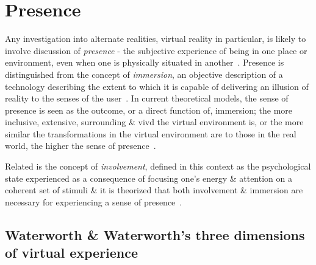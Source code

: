 

\section{Presence}

Any investigation into alternate realities, virtual reality in particular, is likely to involve discussion of \textit{presence} - the subjective experience of being in one place or environment, even when one is physically situated in another~\cite{Witmer1998}. Presence is distinguished from the concept of \textit{immersion}, an objective description of a technology describing the extent to which it is capable of delivering an illusion of reality to the senses of the user~\cite{Slater1997}. In current theoretical models, the sense of presence is seen as the outcome, or a direct function of, immersion; the more inclusive, extensive, surrounding \& vivd the virtual environment is, or the more similar the transformations in the virtual environment are to those in the real world, the higher the sense of presence~\cite{Constantin2003}.

Related is the concept of \textit{involvement}, defined in this context as the psychological state experienced as a consequence of focusing one's energy \& attention on a coherent set of stimuli \& it is theorized that both involvement \& immersion are necessary for experiencing a sense of presence~\cite{Witmer1998}.

\subsection{Waterworth \& Waterworth's three dimensions of virtual experience}

\newcommand{\presencefootnote}{\footnote{\textbf{Presence} in the context of this model is defined as a state of heightened perceptual processing of environmental stimuli (\textit{``a psychological focus on direct perceptual processing''}~\cite{Waterworth2001}) accompanied by lessened conceptual reasoning, whether these environmental stimuli originate from a real environment, a virtual environment, a mixed reality environment, or even from multiple discrete environments.}}

